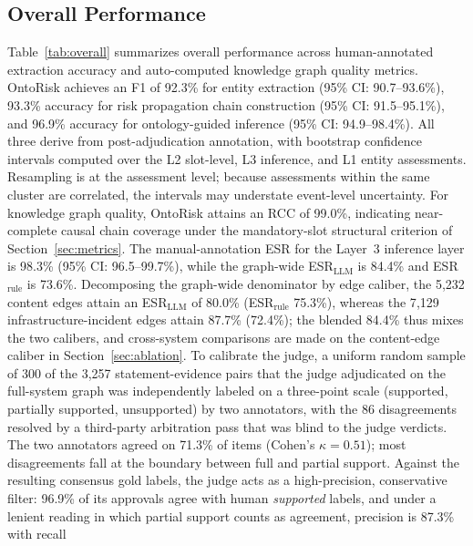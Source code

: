 \documentclass[a4paper,fleqn]{cas-dc}
\begin{document}
\subsection{Overall Performance}
\label{sec:overall_performance}

Table~\ref{tab:overall} summarizes overall performance across
human-annotated extraction accuracy and auto-computed knowledge
graph quality metrics.
OntoRisk achieves an F1 of 92.3\% for entity extraction (95\% CI:
90.7--93.6\%), 93.3\% accuracy for risk propagation chain
construction (95\% CI: 91.5--95.1\%), and 96.9\% accuracy for
ontology-guided inference (95\% CI: 94.9--98.4\%).
All three derive from post-adjudication annotation, with bootstrap
confidence intervals computed over the L2 slot-level, L3 inference,
and L1 entity assessments.
Resampling is at the assessment level; because assessments within the
same cluster are correlated, the intervals may understate
event-level uncertainty.
For knowledge graph quality, OntoRisk attains an RCC of 99.0\%,
indicating near-complete causal chain coverage under the
mandatory-slot structural criterion of Section~\ref{sec:metrics}.
The manual-annotation ESR for the Layer~3 inference layer is 98.3\%
(95\% CI: 96.5--99.7\%), while the graph-wide ESR$_{\text{LLM}}$ is
84.4\% and ESR$_{\text{rule}}$ is 73.6\%.
Decomposing the graph-wide denominator by edge caliber, the 5{,}232
content edges attain an ESR$_{\text{LLM}}$ of 80.0\%
(ESR$_{\text{rule}}$ 75.3\%), whereas the 7{,}129
infrastructure-incident edges attain 87.7\% (72.4\%); the blended
84.4\% thus mixes the two calibers, and cross-system comparisons are
made on the content-edge caliber in Section~\ref{sec:ablation}.
To calibrate the judge, a uniform random sample of 300 of the 3{,}257
statement-evidence pairs that the judge adjudicated on the full-system
graph was independently labeled on a three-point scale (supported,
partially supported, unsupported) by two annotators, with the 86
disagreements resolved by a third-party arbitration pass that was blind
to the judge verdicts.
The two annotators agreed on 71.3\% of items (Cohen's
$\kappa = 0.51$); most disagreements fall at the boundary between
full and partial support.
Against the resulting consensus gold labels, the judge acts as a
high-precision, conservative filter: 96.9\% of its approvals agree with
human \emph{supported} labels, and under a lenient reading in which
partial support counts as agreement, precision is 87.3\% with recall
\end{document}
